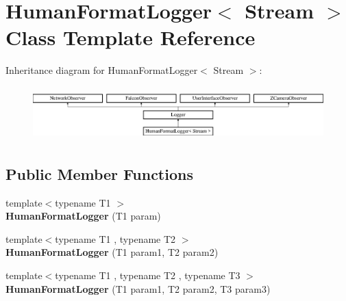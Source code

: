\hypertarget{classHumanFormatLogger}{
\section{HumanFormatLogger$<$ Stream $>$ Class Template Reference}
\label{classHumanFormatLogger}
}
Inheritance diagram for HumanFormatLogger$<$ Stream $>$:\begin{figure}[H]
\begin{center}
\leavevmode
\includegraphics[height=2.089552cm]{classHumanFormatLogger}
\end{center}
\end{figure}
\subsection*{Public Member Functions}
\begin{DoxyCompactItemize}
\item 
\hypertarget{classHumanFormatLogger_a404b51267a3478a726242290a9515bda}{
{\footnotesize template$<$typename T1 $>$ }\\{\bfseries HumanFormatLogger} (T1 param)}
\label{classHumanFormatLogger_a404b51267a3478a726242290a9515bda}

\item 
\hypertarget{classHumanFormatLogger_ae8bb78a585c0870cf9b60012631414d4}{
{\footnotesize template$<$typename T1 , typename T2 $>$ }\\{\bfseries HumanFormatLogger} (T1 param1, T2 param2)}
\label{classHumanFormatLogger_ae8bb78a585c0870cf9b60012631414d4}

\item 
\hypertarget{classHumanFormatLogger_ad8fa4b5491db92d554d3eebdb318c72e}{
{\footnotesize template$<$typename T1 , typename T2 , typename T3 $>$ }\\{\bfseries HumanFormatLogger} (T1 param1, T2 param2, T3 param3)}
\label{classHumanFormatLogger_ad8fa4b5491db92d554d3eebdb318c72e}

\end{DoxyCompactItemize}
